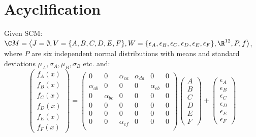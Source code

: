 
\section{Acyclification}
Given SCM: $\C M = \left\langle J=\emptyset, V=\{A, B, C, D, E, F\}, W=\{\epsilon_A, \epsilon_B, \epsilon_C, \epsilon_D, \epsilon_E, \epsilon_F\}, \R^{12}, P, f \right\rangle$, where $P$ are six independent normal distributions with means and standard deviations $\mu_A, \sigma_A, \mu_B, \sigma_B$ etc. and:
\[
\begin{pmatrix}
	f_A(x) \\ f_B(x) \\ f_C(x) \\ f_D(x) \\ f_E(x) \\ f_F(x)
\end{pmatrix}
= 
\begin{pmatrix}
	0 & 0 & \alpha_{ca} & \alpha_{da} & 0 & 0 \\
	\alpha_{ab} & 0 & 0 & 0 & \alpha_{eb} & 0 \\
	0 & \alpha_{bc} & 0 & 0 & 0 & 0 \\
	0 & 0 & 0 & 0 & 0 & 0 \\
	0 & 0 & 0 & 0 & 0 & 0 \\
	0 & 0 & \alpha_{cf} & 0 & 0 & 0 \\
\end{pmatrix}
\begin{pmatrix}
	A \\ B \\ C \\ D \\ E \\ F
\end{pmatrix}
+
\begin{pmatrix}
	\epsilon_A \\ \epsilon_B \\ \epsilon_C \\ \epsilon_D \\ \epsilon_E \\ \epsilon_F
\end{pmatrix}
\]
